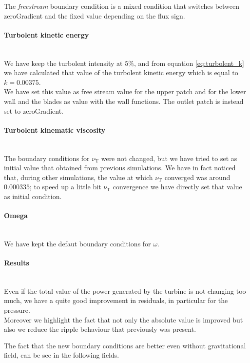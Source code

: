 \documentclass[a4paper,12pt]{article}
\newcommand{\nut}{\nu_\text{T}}
\begin{document}
The \emph{freestream} boundary condition is a mixed condition that switches between zeroGradient and the fixed value depending on the flux sign.

\paragraph{Turbolent kinetic energy}\mbox{}\\
We have keep the turbolent intensity at $5\%$, and from equation \ref{eq:turbolent_k} we have calculated that value of the turbolent kinetic energy which is equal to $k = 0.00375$.\\
We have set this value as free stream value for the upper patch and for the lower wall and the blades as value with the wall functions.
The outlet patch is instead set to zeroGradient.

\paragraph{Turbolent kinematic viscosity}\mbox{}\\
The boundary conditions for $\nut$ were not changed, but we have tried to set as initial value that obtained from previous simulations. We have in fact noticed that, during other simulations, the value at which $\nut$ converged was around $0.000335$; to speed up a little bit $\nut$ convergence we have directly set that value as initial condition.

\paragraph{Omega}\mbox{}\\
We have kept the defaut boundary conditions for $\omega$.

\paragraph{Results}\mbox{}\\
Even if the total value of the power generated by the turbine is not changing too much, we have a quite good improvement in residuals, in particular for the pressure.
\\Moreover we highlight the fact that not only the absolute value is improved but also we reduce the ripple behaviour that previously was present.

The fact that the new boundary conditions are better even without gravitational field, can be see in the following fields.
\end{document}
